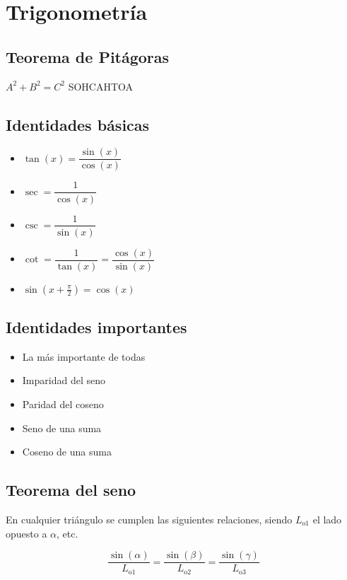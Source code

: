 \section{Trigonometría}

\subsection*{Teorema de Pitágoras}

\hfil
$A^2 + B^2 = C^2$
\hfil
SOHCAHTOA
\hfil

\subsection*{Identidades básicas}

\begin{itemize}
\item $\tan(x) = \dfrac{\sin(x)}{\cos(x)}$
\item $\sec = \dfrac{1}{\cos(x)}$
\item $\csc = \dfrac{1}{\sin(x)}$
\item $\cot = \dfrac{1}{\tan(x)} = \dfrac{\cos(x)}{\sin(x)}$
\item $\sin\left(x + \frac{\pi}{2}\right) = \cos(x)$
\end{itemize}

\subsection*{Identidades importantes}

\begin{itemize}
    \item {} La más importante de todas

    \item {} Imparidad del seno

    \item {} Paridad del coseno

    \item {} Seno de una suma
    
    \item {} Coseno de una suma
\end{itemize}


\subsection*{Teorema del seno}

En cualquier triángulo se cumplen las siguientes relaciones, siendo $L_{\text{o1}}$ el lado opuesto a $\alpha$, etc.

$$
\dfrac{\sin(\alpha)}{L_{\text{o1}}} = 
\dfrac{\sin(\beta)}{L_{\text{o2}}} = 
\dfrac{\sin(\gamma)}{L_{\text{o3}}}
$$